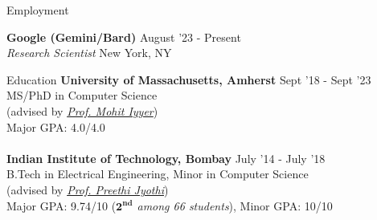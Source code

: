 \documentclass{resume} %
\begin{document}

\begin{rSection}{Employment}
\vspace*{0.1in}

{\bf Google (Gemini/Bard)} { \hfill August '23 - Present}\\ \textit{Research Scientist} {\hfill New York, NY}

\end{rSection}

\begin{rSection}{Education}
\vspace*{0.1in}
{\bf University of Massachusetts, Amherst} \hfill {Sept '18 - Sept '23} \\ MS/PhD in Computer Science \\ (advised by \textit{\href{https://people.cs.umass.edu/~miyyer/}{Prof. Mohit Iyyer}}) \\
Major GPA: 4.0/4.0\\\\
{\bf Indian Institute of Technology, Bombay} \hfill {July '14 - July '18} \\ 
B.Tech in Electrical Engineering, Minor in Computer Science\\
(advised by \textit{\href{https://www.cse.iitb.ac.in/~pjyothi/}{Prof. Preethi Jyothi}})\\
Major GPA: 9.74/10 (\textit{$\mathbf{2^{nd}}$ among 66 students}), Minor GPA: 10/10
\end{rSection}
\end{document}
